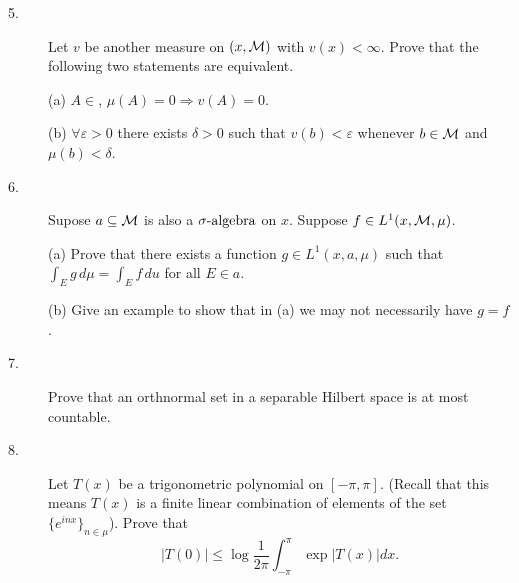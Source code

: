 \documentclass[bbb]{report}
\def\ds{\displaystyle}
\def\M{{\cal M}}
\begin{document}
\begin{large}
\begin{description}
\vspace{.15in}

\item[5.]
Let $v$ be another measure on $(x,\M)$ with $v(x)<\infty$.
Prove that the following two statements are equivalent.
\item[\quad] (a)
$A\in $, $\mu(A)=0\Rightarrow v(A)=0$.

\item[\quad] (b)
$\forall \varepsilon >0$ there exists $\delta>0$ such that
$v(b)<\varepsilon$ whenever $b\in \M$ and $\mu(b)<\delta$.

\vspace{.15in}

\item[6.]
Supose $a\subseteq \M$ is also a $\sigma\hbox{-algebra}$ on $x$.
Suppose $f\in L^1(x,\M,\mu)$.

\item[\quad] (a)
Prove that there exists a function $g\in L^1(x,a,\mu)$ such that
$\ds\int_Eg\, d\mu=\ds\int_Ef\,du$ for all $E\in a$.

\item[\quad] (b)
Give an example to show that in (a) we may not necessarily have $g=f$.

\vspace{.15in}

\item[7.]
Prove that an orthnormal set in a separable Hilbert space is at most
countable.

\vspace{.15in}

\item[8.]
Let $T(x)$ be a trigonometric polynomial on $[-\pi,\pi]$.
(Recall that this means $T(x)$ is a finite linear combination of
elements of the set $\{e^{inx}\}_{n\in \mu}$).
Prove that
$$ |T(0)|\leq \log \frac{1}{2\pi}\int^\pi_{-\pi} \exp|T(x)|dx.$$



\vfill



\end{description}

\end{large}
\end{document}
